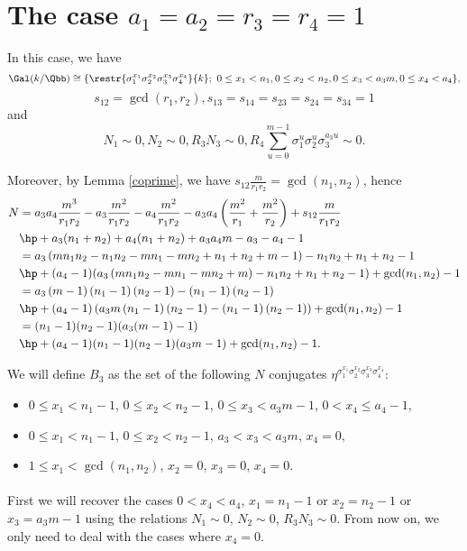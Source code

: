 \section{The case $a_1=a_2=r_3=r_4=1$}
In this case, we have
$$\Gal(k/\Qbb)\cong
 \{\restr{\sigma_1^{x_1}\sigma_2^{x_2}\sigma_3^{x_3}\sigma_4^{x_4}}{k};~  0\leq x_1<n_1, 0\leq x_2<n_2, 0\leq x_3<a_3m,0\leq x_4<a_4\},$$
  $$s_{12}=\gcd(r_1,r_2),s_{13}=s_{14}=s_{23}=s_{24}=s_{34}=1$$
 and $$N_1\sim 0, N_2\sim 0, R_3N_3 \sim 0, R_4 \sum_{u=0}^{m-1}\sigma_1^u\sigma_2^u\sigma_3^{a_3u} \sim 0.$$

Moreover, by Lemma \ref{coprime}, we have $s_{12}\frac{m}{r_1r_2}=\gcd(n_1,n_2)$, hence
\begin{align*}
N&=a_3a_4\frac{m^3}{r_1r_2}-a_3\frac{m^2}{r_1r_2}-a_4\frac{m^2}{r_1r_2}-a_3a_4\left(\frac{m^2}{r_1}+\frac{m^2}{r_2}\right)+s_{12}\frac{m}{r_1r_2}\\
&\hp+a_3(n_1+n_2)+a_4(n_1+n_2)+a_3a_4m-a_3-a_4-1\\
&=a_3\left(mn_1n_2-n_1n_2 -mn_1-mn_2+n_1+n_2+m-1\right)-n_1n_2+n_1+n_2-1\\
&\hp+(a_4-1)(a_3\left(mn_1n_2 -mn_1-mn_2+m\right)-n_1n_2+n_1+n_2-1)+\gcd(n_1,n_2)-1\\
&=a_3\left(m-1\right)\left(n_1-1\right)\left(n_2-1\right)-\left(n_1-1\right)\left(n_2-1\right)\\
&\hp+(a_4-1)\left(a_3m\left(n_1-1\right)\left(n_2-1\right)-\left(n_1-1\right)\left(n_2-1\right)\right)+\gcd(n_1,n_2)-1\\
&=(n_1-1)(n_2-1)(a_3(m-1)-1)\\
&\hp+(a_4-1)(n_1-1)(n_2-1)(a_3m-1)+\gcd(n_1,n_2)-1.
\end{align*}

We will define $B_3$ as the set of the following $N$ conjugates $\eta^{\sigma_1^{x_1}\sigma_2^{x_2}\sigma_3^{x_3}\sigma_4^{x_4}}$:
\begin{itemize}
\item $0\leq x_1<n_1-1$, $ 0\leq x_2<n_2-1$, $ 0\leq x_3<a_3m-1$, $ 0<x_4\leq a_4-1$,
\item $0\leq x_1<n_1-1$, $ 0\leq x_2<n_2-1$, $ a_3<x_3<a_3m$, $ x_4=0,$
\item $1\leq x_1<\gcd(n_1,n_2)$, $ x_2=0$, $ x_3=0$, $x_4=0$.
\end{itemize}

\paragraph*{}
First we will recover the cases $0<x_4<a_4$, $x_1=n_1-1$ or $x_2=n_2-1$ or $x_3=a_3m-1$ using the relations $N_1\sim 0$, $ N_2\sim 0$, $ R_3N_3\sim 0$. From now on, we only need to deal with the cases where $x_4=0$.
